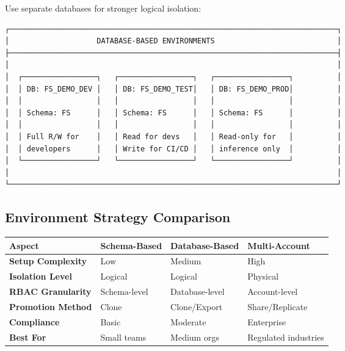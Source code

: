 \documentclass[
  letterpaper,
  DIV=11,
  numbers=noendperiod]{scrreprt}
\begin{document}
Use separate databases for stronger logical isolation:

\begin{verbatim}
┌───────────────────────────────────────────────────────────────────────────┐
│                    DATABASE-BASED ENVIRONMENTS                            │
├───────────────────────────────────────────────────────────────────────────┤
│                                                                           │
│  ┌─────────────────┐   ┌─────────────────┐   ┌─────────────────┐          │
│  │ DB: FS_DEMO_DEV │   │ DB: FS_DEMO_TEST│   │ DB: FS_DEMO_PROD│          │
│  │                 │   │                 │   │                 │          │
│  │ Schema: FS      │   │ Schema: FS      │   │ Schema: FS      │          │
│  │                 │   │                 │   │                 │          │
│  │ Full R/W for    │   │ Read for devs   │   │ Read-only for   │          │
│  │ developers      │   │ Write for CI/CD │   │ inference only  │          │
│  └─────────────────┘   └─────────────────┘   └─────────────────┘          │
│                                                                           │
└───────────────────────────────────────────────────────────────────────────┘
\end{verbatim}

\hypertarget{environment-strategy-comparison}{%
\subsection{Environment Strategy
Comparison}\label{environment-strategy-comparison}}

\begin{longtable}[]{@{}llll@{}}
\toprule\noalign{}
Aspect & Schema-Based & Database-Based & Multi-Account \\
\midrule\noalign{}
\endhead
\bottomrule\noalign{}
\endlastfoot
\textbf{Setup Complexity} & Low & Medium & High \\
\textbf{Isolation Level} & Logical & Logical & Physical \\
\textbf{RBAC Granularity} & Schema-level & Database-level &
Account-level \\
\textbf{Promotion Method} & Clone & Clone/Export & Share/Replicate \\
\textbf{Compliance} & Basic & Moderate & Enterprise \\
\textbf{Best For} & Small teams & Medium orgs & Regulated industries \\
\end{longtable}
\end{document}
